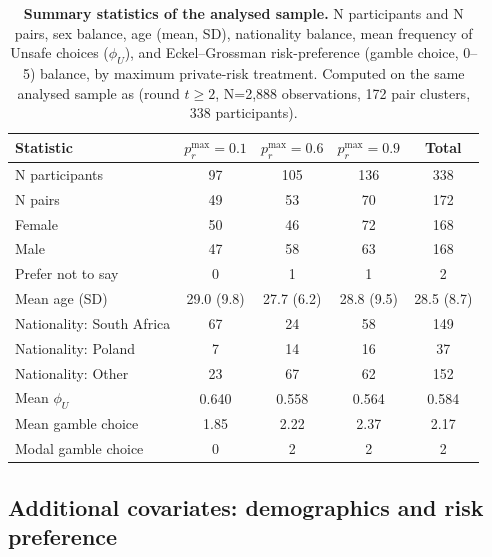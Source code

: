 \documentclass[pdflatex,sn-mathphys-ay]{sn-jnl}
\theoremstyle{thmstyleone}
\theoremstyle{thmstyletwo}
\theoremstyle{thmstylethree}
\begin{document}
\begin{table}[h]
\centering
\small
\caption{\textbf{Summary statistics of the analysed sample.} N participants and N pairs, sex balance, age (mean, SD), nationality balance, mean frequency of Unsafe choices (\(\phi_U\)), and Eckel--Grossman risk-preference (gamble choice, 0--5) balance, by maximum private-risk treatment. Computed on the same analysed sample as  (round \(t\geq2\), N=2,888 observations, 172 pair clusters, 338 participants).}
\label{tab:si:summary-stats}
\begin{tabular}{lcccc}
\toprule
Statistic & \(p_r^{\max}=0.1\) & \(p_r^{\max}=0.6\) & \(p_r^{\max}=0.9\) & Total \\
\midrule
N participants & 97 & 105 & 136 & 338 \\
N pairs & 49 & 53 & 70 & 172 \\
Female & 50 & 46 & 72 & 168 \\
Male & 47 & 58 & 63 & 168 \\
Prefer not to say & 0 & 1 & 1 & 2 \\
Mean age (SD) & 29.0 (9.8) & 27.7 (6.2) & 28.8 (9.5) & 28.5 (8.7) \\
Nationality: South Africa & 67 & 24 & 58 & 149 \\
Nationality: Poland & 7 & 14 & 16 & 37 \\
Nationality: Other & 23 & 67 & 62 & 152 \\
Mean \(\phi_U\) & 0.640 & 0.558 & 0.564 & 0.584 \\
Mean gamble choice & 1.85 & 2.22 & 2.37 & 2.17 \\
Modal gamble choice & 0 & 2 & 2 & 2 \\
\bottomrule
\end{tabular}
\end{table}

\subsection{Additional covariates: demographics and risk preference}
\label{si:sec:data-analysis-demographics}
\label{si:sec:data-analysis-risk}
\end{document}
